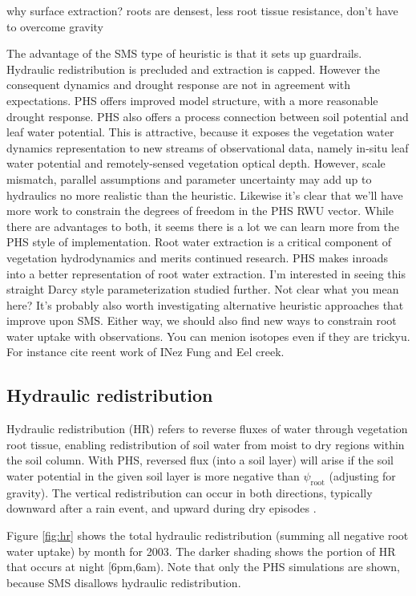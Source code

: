 \documentclass[draft,linenumbers]{agujournal}
\begin{document}
why surface extraction?
roots are densest, less root tissue resistance, don't have to overcome gravity

The advantage of the SMS type of heuristic is that it sets up guardrails.
Hydraulic redistribution is precluded and extraction is capped.
However the consequent dynamics and drought response are not in agreement with expectations.
PHS offers improved model structure, with a more reasonable drought response.
PHS also offers a process connection between soil potential and leaf water potential.
This is attractive, because it exposes the vegetation water dynamics representation to new streams of observational data, 
namely in-situ leaf water potential and remotely-sensed vegetation optical depth.
However, scale mismatch, parallel assumptions and parameter uncertainty may add up to hydraulics no more realistic than the heuristic.
Likewise it's clear that we'll have more work to constrain the degrees of freedom in the PHS RWU vector.
While there are advantages to both, it seems there is a lot we can learn more from the PHS style of implementation.
Root water extraction is a critical component of vegetation hydrodynamics and merits continued research.
PHS makes inroads into a better representation of root water extraction.
I'm interested in seeing this straight Darcy style parameterization studied further. Not clear what you mean here? 
It's probably also worth investigating alternative heuristic approaches that improve upon SMS.
Either way, we should also find new ways to constrain root water uptake with observations. You can menion isotopes even if they are trickyu. For instance cite reent work of INez Fung and Eel creek.


\subsection{Hydraulic redistribution}

Hydraulic redistribution (HR) refers to reverse fluxes of water through vegetation root tissue, enabling redistribution of soil water from moist to dry regions within the soil column.
With PHS, reversed flux (into a soil layer) will arise if the soil water potential in the given soil layer is more negative than $\psi_{\text{root}}$ (adjusting for gravity).
The vertical redistribution can occur in both directions, typically downward after a rain event, and upward during dry episodes \citep{burgess1998}.

Figure \ref{fig:hr} shows the total hydraulic redistribution (summing all negative root water uptake) by month for 2003. 
The darker shading shows the portion of HR that occurs at night [6pm,6am). 
Note that only the PHS simulations are shown, because SMS disallows hydraulic redistribution.
\end{document}
